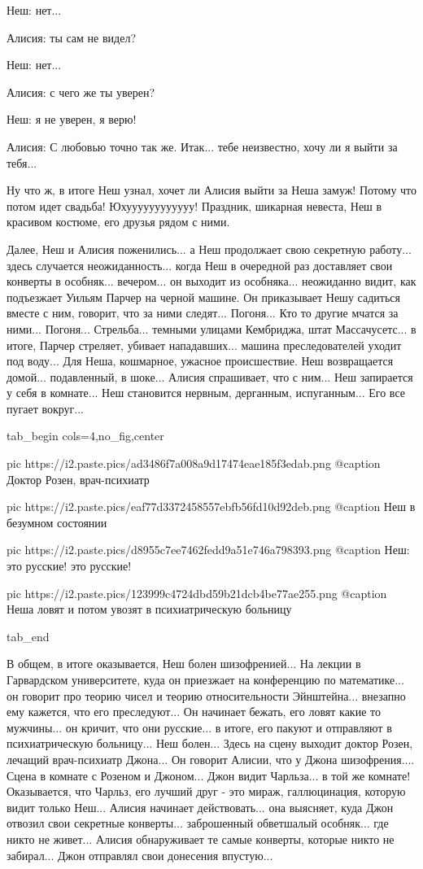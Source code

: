 Неш: нет...

Алисия: ты сам не видел?

Неш: нет...

Алисия: с чего же ты уверен?

Неш: я не уверен, я верю!

Алисия: С любовью точно так же. Итак... тебе неизвестно, хочу ли я выйти за тебя...

Ну что ж, в итоге Неш узнал, хочет ли Алисия выйти за Неша замуж! Потому что
потом идет свадьба!  Юхуууууууууууу! Праздник, шикарная невеста, Неш в красивом
костюме, его друзья рядом с ними.

Далее, Неш и Алисия поженились... а Неш продолжает свою секретную работу...
здесь случается неожиданность... когда Неш в очередной раз доставляет свои
конверты в особняк...  вечером... он выходит из особняка... неожиданно видит,
как подъезжает Уильям Парчер на черной машине.  Он приказывает Нешу садиться
вместе с ним, говорит, что за ними следят... Погоня... Кто то другие мчатся за
ними... Погоня... Стрельба... темными улицами Кембриджа, штат Массачусетс... в
итоге, Парчер стреляет, убивает нападавших... машина преследователей уходит под
воду... Для Неша, кошмарное, ужасное происшествие.  Неш возвращается домой...
подавленный, в шоке... Алисия спрашивает, что с ним... Неш запирается у себя в
комнате... Неш становится нервным, дерганным, испуганным... Его все пугает вокруг... 

\ifcmt
  tab_begin cols=4,no_fig,center

     pic https://i2.paste.pics/ad3486f7a008a9d17474eae185f3edab.png
		 @caption Доктор Розен, врач-психиатр

		 pic https://i2.paste.pics/eaf77d3372458557ebfb56fd10d92deb.png
		 @caption Неш в безумном состоянии

		 pic https://i2.paste.pics/d8955c7ee7462fedd9a51e746a798393.png
		 @caption Неш: это русские! это русские!

		 pic https://i2.paste.pics/123999c4724dbd59b21dcb4be77ae255.png
		 @caption Неша ловят и потом увозят в психиатрическую больницу

  tab_end
\fi

В общем, в итоге оказывается, Неш болен шизофренией... На лекции в Гарвардском
университете, куда он приезжает на конференцию по математике... он говорит про
теорию чисел и теорию относительности Эйнштейна...  внезапно ему кажется, что
его преследуют... Он начинает бежать, его ловят какие то мужчины...  он кричит,
что они русские... в итоге, его пакуют и отправляют в психиатрическую
больницу...  Неш болен... Здесь на сцену выходит доктор Розен, лечащий
врач-психиатр Джона... Он говорит Алисии, что у Джона шизофрения....  Сцена в
комнате с Розеном и Джоном... Джон видит Чарльза... в той же комнате!
Оказывается, что Чарльз, его лучший друг - это мираж, галлюцинация, которую
видит только Неш...  Алисия начинает действовать... она выясняет, куда Джон
отвозил свои секретные конверты...  заброшенный обветшалый особняк... где никто
не живет... Алисия обнаруживает те самые конверты, которые никто не забирал...
Джон отправлял свои донесения впустую...  


